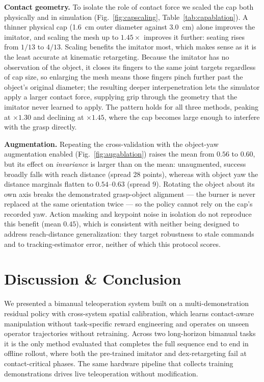 \documentclass[letterpaper, 10 pt, conference]{ieeeconf}
\begin{document}
\textbf{Contact geometry.} To isolate the role of contact force we scaled the cap both
physically and in simulation (Fig.~\ref{fig:capscaling}, Table~\ref{tab:capablation}). A thinner physical cap
(\SI{1.6}{\centi\meter} outer diameter against \SI{3.0}{\centi\meter}) alone improves
the imitator, and scaling the mesh up to $1.45\times$ improves it further: seating rises
from $1/13$ to $4/13$. Scaling benefits the imitator most, which makes sense as it is
the least accurate at kinematic retargeting. Because the imitator has no observation of
the object, it closes its fingers to the same joint targets regardless of cap size, so
enlarging the mesh means those fingers pinch further past the object's original
diameter; the resulting deeper interpenetration lets the simulator apply a larger contact
force, supplying grip through the geometry that the imitator never learned to apply. The
pattern holds for all three methods, peaking at $\times 1.30$ and declining at
$\times 1.45$, where the cap becomes large enough to interfere with the grasp directly.


\textbf{Augmentation.} Repeating the cross-validation with the object-yaw augmentation
enabled (Fig.~\ref{fig:augablation}) raises the mean from $0.56$ to $0.60$, but its
effect on \emph{invariance} is
larger than on the mean: unaugmented, success broadly falls with reach distance (spread
28 points), whereas with object yaw the distance marginals flatten to $0.54$--$0.63$
(spread 9). Rotating the object about its own axis breaks the demonstrated grasp-object
alignment --- the burner is never replaced at the same orientation twice --- so the
policy cannot rely on the cap's recorded yaw. Action masking and keypoint noise in
isolation do not reproduce this benefit (mean $0.45$), which is consistent with neither
being designed to address reach-distance generalization: they target robustness to stale
commands and to tracking-estimator error, neither of which this protocol scores.

\section{Discussion \& Conclusion}

We presented a bimanual teleoperation system built on a multi-demonstration residual
policy with cross-system spatial calibration, which learns contact-aware manipulation
without task-specific reward engineering and operates on unseen operator trajectories
without retraining. Across two long-horizon bimanual tasks it is the only method
evaluated that completes the full sequence end to end in offline rollout, where both the
pre-trained imitator and dex-retargeting fail at contact-critical phases. The same
hardware pipeline that collects training demonstrations drives live teleoperation
without modification.
\end{document}
